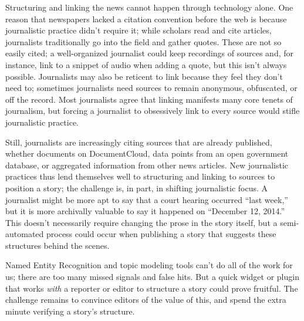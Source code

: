 Structuring and linking the news cannot happen through technology alone. One reason that newspapers lacked a citation convention before the web is because journalistic practice didn't require it; while scholars read and cite articles, journalists traditionally go into the field and gather quotes. These are not so easily cited; a well-organized journalist could keep recordings of sources and, for instance, link to a snippet of audio when adding a quote, but this isn't always possible. Journalists may also be reticent to link because they feel they don't need to; sometimes journalists need sources to remain anonymous, obfuscated, or off the record. Most journalists agree that linking manifests many core tenets of journalism, but forcing a journalist to obsessively link to every source would stifle journalistic practice.

Still, journalists are increasingly citing sources that are already published, whether documents on DocumentCloud, data points from an open government database, or aggregated information from other news articles. New journalistic practices thus lend themselves well to structuring and linking to sources to position a story; the challenge is, in part, in shifting journalistic focus. A journalist might be more apt to say that a court hearing occurred ``last week,'' but it is more archivally valuable to say it happened on ``December 12, 2014.'' This doesn't necessarily require changing the prose in the story itself, but a semi-automated process could occur when publishing a story that suggests these structures behind the scenes.

Named Entity Recognition and topic modeling tools can't do all of the work for us; there are too many missed signals and false hits. But a quick widget or plugin that works \emph{with} a reporter or editor to structure a story could prove fruitful. The challenge remains to convince editors of the value of this, and spend the extra minute verifying a story's structure.


